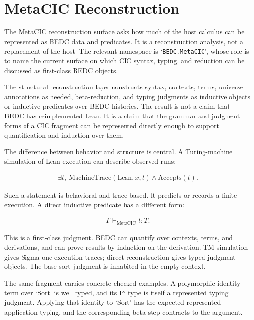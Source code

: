 \section{MetaCIC Reconstruction}\label{sec:self-comp-metacic}

The MetaCIC reconstruction surface asks how much of the host calculus can be
represented as BEDC data and predicates. It is a reconstruction analysis, not a
replacement of the host. The relevant namespace is `\verb|BEDC.MetaCIC|', whose
role is to name the current surface on which CIC syntax, typing, and reduction
can be discussed as first-class BEDC objects.

The structural reconstruction layer constructs syntax, contexts, terms,
universe annotations as needed, beta-reduction, and typing judgments as
inductive objects or inductive predicates over BEDC histories.
The result is not a claim that BEDC has reimplemented Lean. It is a claim that
the grammar and judgment forms of a CIC fragment can be represented directly
enough to support quantification and induction over them.

The difference between behavior and structure is central. A Turing-machine
simulation of Lean execution can describe observed runs:

$$
\begin{aligned}
\exists t,\ \mathrm{MachineTrace}(\mathrm{Lean},x,t)
  \wedge \mathrm{Accepts}(t).
\end{aligned}
$$

Such a statement is behavioral and trace-based. It predicts or records a
finite execution. A direct inductive predicate has a different form:

$$
\begin{aligned}
\Gamma \vdash_{\mathrm{MetaCIC}} t : T.
\end{aligned}
$$

This is a first-class judgment. BEDC can quantify over contexts, terms, and
derivations, and can prove results by induction on the derivation. TM
simulation gives Sigma-one execution traces; direct reconstruction gives
typed judgment objects. The base sort judgment is inhabited in the empty
context. 

The same fragment carries concrete checked examples. A polymorphic identity
term over `Sort' is well typed, and its Pi type is itself a represented typing
judgment. 
 Applying that identity
to `Sort' has the expected represented application typing, and the corresponding
beta step contracts to the argument. 


